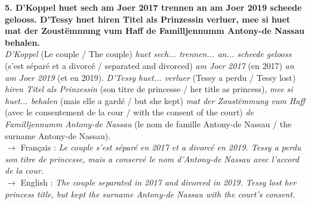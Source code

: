\noindent\textbf{5. D'Koppel huet sech am Joer 2017 trennen an am Joer 2019 scheede gelooss. D'Tessy huet hiren Titel als Prinzessin verluer, mee si huet mat der Zoustëmmung vum Haff de Familljennumm Antony-de Nassau behalen.}\\
\textit{D'Koppel} (Le couple / The couple) \textit{huet sech... trennen... an... scheede gelooss} (s'est séparé et a divorcé / separated and divorced) \textit{am Joer 2017} (en 2017) \textit{an am Joer 2019} (et en 2019). \textit{D'Tessy huet... verluer} (Tessy a perdu / Tessy lost) \textit{hiren Titel als Prinzessin} (son titre de princesse / her title as princess), \textit{mee si huet... behalen} (mais elle a gardé / but she kept) \textit{mat der Zoustëmmung vum Haff} (avec le consentement de la cour / with the consent of the court) \textit{de Familljennumm Antony-de Nassau} (le nom de famille Antony-de Nassau / the surname Antony-de Nassau).\\
$\rightarrow$ Français : \textit{Le couple s'est séparé en 2017 et a divorcé en 2019. Tessy a perdu son titre de princesse, mais a conservé le nom d'Antony-de Nassau avec l'accord de la cour.}\\
$\rightarrow$ English : \textit{The couple separated in 2017 and divorced in 2019. Tessy lost her princess title, but kept the surname Antony-de Nassau with the court's consent.}\\[0.5em]


